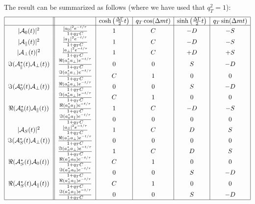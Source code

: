 \documentclass[a4paper,9pt,twoside]{article}
\begin{document}
The result can be summarized as follows (where we have used that $q_T^2=1$):
\begin{equation}
\begin{array}{|c|| c | c | c | c | c |}
 \hline
                                             &                          &  \cosh\left(\frac{\Delta\Gamma}{2}t\right) & q_T \cos(\Delta m t)  & \sinh\left(\frac{\Delta\Gamma}{2}t\right) &q_T\sin(\Delta m t)  \\
 \hline
|{\cal A}_0(t)|^2                           &\frac{  | a_0 |^2 e^{-t/\tau}}{1+q_TC}                  & 1 &   C  &  -D & -S   \\
|{\cal A}_\parallel(t)|^2                   &\frac{  | a_\parallel |^2 e^{-t/\tau}}{1+q_TC}          & 1 &   C  &  -D & -S   \\
|{\cal A}_\perp(t)|^2                       &\frac{  | a_\perp |^2 e^{-t/\tau}}{1+q_TC}              & 1 &   C  &  +D & +S   \\
\Im({\cal A}_\parallel^*(t){\cal A}_\perp(t)) &\frac{  \Re(a_\parallel^* a_\perp)e^{-t/\tau}}{1+q_TC}& 0 &   0  &   S & -D   \\                         
                                            &\frac{  \Im(a_\parallel^* a_\perp)e^{-t/\tau}}{1+q_TC}  & C &   1  &   0 &  0   \\
\Im({\cal A}_0^*(t){\cal A}_\perp(t))         &\frac{  \Re(a_0^* a_\perp)e^{-t/\tau}}{1+q_TC}        & 0 &   0  &   S & -D   \\
                                            &\frac{  \Im(a_0^* a_\perp)e^{-t/\tau}}{1+q_TC}          & C &   1  &   0 &  0   \\
\Re({\cal A}_0^*(t){\cal A}_\parallel(t))     &\frac{  \Re(a_0^*a_\parallel)e^{-t/\tau}}{1+q_TC}     & 1 &   C  &  -D & -S   \\
                                            &\frac{  \Im(a_0^*a_\parallel)e^{-t/\tau}}{1+q_TC}       & 0 &   0  &   0 &  0   \\
|{\cal A}_S(t)|^2                           &\frac{  | a_S |^2 e^{-t/\tau}}{1+q_TC}                  & 1 &   C  &  D & S   \\
\Im({\cal A}_S^*(t){\cal A}_\perp(t)) &\frac{  \Re(a_S^* a_\perp)e^{-t/\tau}}{1+q_TC}                & 0 &   0  &   0 & 0   \\                         
                                            &\frac{  \Im(a_S^* a_\perp)e^{-t/\tau}}{1+q_TC}          & 1 &  C  &   D &  S   \\
\Re({\cal A}_S^*(t){\cal A}_0(t))         &\frac{  \Re(a_S^* a_0)e^{-t/\tau}}{1+q_TC}                & C &   1  &   0 & 0   \\
                                            &\frac{  \Im(a_S^* a_0)e^{-t/\tau}}{1+q_TC}              & 0 &   0  &   S &  -D   \\
\Re({\cal A}_S^*(t){\cal A}_\parallel(t))     &\frac{  \Re(a_S^*a_\parallel)e^{-t/\tau}}{1+q_TC}     & C &   1  &  0 & 0   \\
                                            &\frac{  \Im(a_S^*a_\parallel)e^{-t/\tau}}{1+q_TC}       & 0 &   0  &   S &  -D   \\
\hline
\end{array}
\end{equation}
\end{document}
